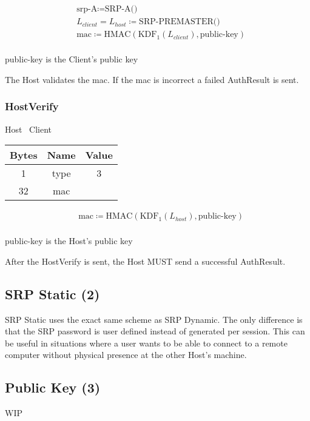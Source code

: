 \begin{align*}
    & \text{srp-A} \coloneqq \text{SRP-A()}\\
    & L_{client} = L_{host} \coloneqq \text{SRP-PREMASTER()}\\
    & \text{mac} \coloneqq \text{HMAC}(\text{KDF}_1(L_{client}), \text{public-key})\\
\end{align*}

public-key is the Client's public key

The Host validates the mac. If the mac is incorrect a failed AuthResult is sent.

\subsubsection{HostVerify}

\begin{center}
    Host \textrightarrow\ Client\\
    \begin{tabular}{|c|c|c|}
        \hline
        \textbf{Bytes} & \textbf{Name} & \textbf{Value} \\
        \hline
        1              & type          & 3              \\
        \hline
        32             & mac           &                \\
        \hline
    \end{tabular}
\end{center}

\begin{align*}
    & \text{mac} \coloneqq \text{HMAC}(\text{KDF}_1(L_{host}), \text{public-key})\\
\end{align*}

public-key is the Host's public key

After the HostVerify is sent, the Host MUST send a successful AuthResult.

\subsection{SRP Static (2)}

SRP Static uses the exact same scheme as SRP Dynamic. The only difference is that the SRP password is user defined instead of generated per session. This can be useful in situations where a user wants to be able to connect to a remote computer without physical presence at the other Host's machine.

\subsection{Public Key (3)}

WIP